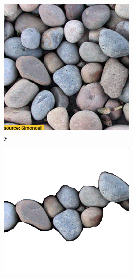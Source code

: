 \begin{figure}[]
    \centering    
    \begin{subfigure}{\textwidth}
        \centering
        \begin{subfigure}{0.24\textwidth}
            \centering
            \includegraphics[width=\textwidth]{images/04-experiment01/pebbles/target.jpg}
            \caption{\(\bm{y}\)}
            \label{fig:ex01-pebbles-5steps-some_target}
        \end{subfigure}
        \hfill
        \begin{subfigure}{0.24\textwidth}
            \centering
            \includegraphics[width=\textwidth]{images/04-experiment01/pebbles/some_bg.jpg}

\end{subfigure}
\end{subfigure}
\end{figure}
